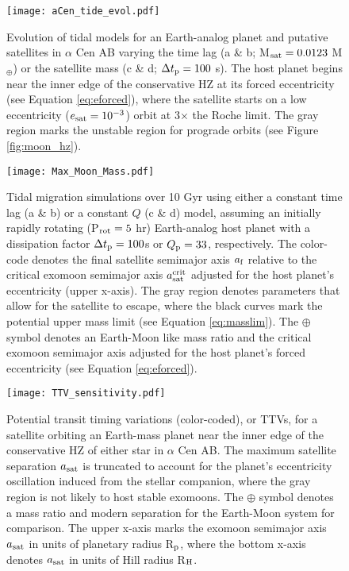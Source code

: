 \documentclass[preprint]{aastex63}
\begin{document}
\begin{figure}
	\texttt{[image: aCen\_tide\_evol.pdf]}
    \caption{Evolution of tidal models for an Earth-analog planet and putative satellites in $\alpha$ Cen AB varying the time lag (a \& b; M$_{\rm sat} = { 0.0123}$ M$_\oplus$) or the satellite mass (c \& d; $\Delta t_{\rm p} = 100$ s).  The host planet begins near the inner edge of the conservative HZ at its forced eccentricity (see Equation \ref{eq:eforced}), where the satellite starts on a low eccentricity ($e_{\rm sat} = 10^{-3}$) orbit at 3$\times$ the Roche limit.  The gray region marks the unstable region for prograde orbits (see Figure \ref{fig:moon_hz}). }
    \label{fig:param_comp}
\end{figure}

\begin{figure}
	\texttt{[image: Max\_Moon\_Mass.pdf]}
    \caption{Tidal migration simulations over 10 Gyr using either a constant time lag (a \& b) or a constant $Q$ (c \& d) model, assuming an initially rapidly rotating (P$_{\rm rot} = 5$ hr) Earth-analog host planet with a dissipation factor $\Delta t_{\rm p} = 100 $s or $Q_{\rm p} = 33$, respectively.  The color-code denotes the final satellite semimajor axis $a_{\rm f}$ relative to the critical exomoon semimajor axis $a_{\rm sat}^{\rm crit}$ adjusted for the host planet's eccentricity (upper x-axis).  The gray region denotes parameters that allow for the satellite to escape, where the black curves mark the potential upper mass limit (see Equation \ref{eq:masslim}).  The $\oplus$ symbol denotes an Earth-Moon like mass ratio and the critical exomoon semimajor axis adjusted for the host planet's forced eccentricity (see Equation \ref{eq:eforced}).}
    \label{fig:max_moon_hz}
\end{figure}

\begin{figure}
	\texttt{[image: TTV\_sensitivity.pdf]}
    \caption{Potential transit timing variations (color-coded), or TTVs, for a satellite orbiting an Earth-mass planet near the inner edge of the conservative HZ of either star in $\alpha$ Cen AB.  The maximum satellite separation $a_{\rm sat}$ is truncated to account for the planet's eccentricity oscillation induced from the stellar companion, where the gray region is {not} likely to host stable exomoons.  The $\oplus$ symbol denotes a mass ratio and modern separation for the Earth-Moon system for comparison.  The upper x-axis marks the exomoon semimajor axis $a_{\rm sat}$ in units of planetary radius R$_{\rm p}$, where the bottom x-axis denotes $a_{\rm sat}$ in units of Hill radius R$_{\rm H}$. }
    \label{fig:TTV_curves}
\end{figure}
\end{document}
